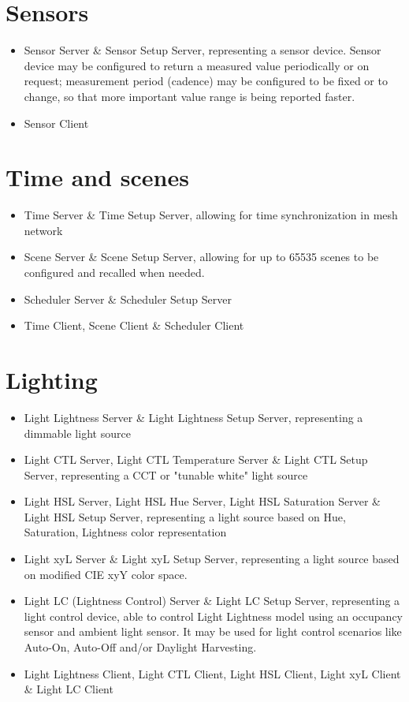 \section{Sensors}
\begin{itemize}
\item Sensor Server \& Sensor Setup Server, representing a sensor device. Sensor device may be configured to return a measured value periodically or on request; measurement period (cadence) may be configured to be fixed or to change, so that more important value range is being reported faster.
\item Sensor Client
\end{itemize}

\section{Time and scenes}
\begin{itemize}
\item Time Server \& Time Setup Server, allowing for time synchronization in mesh network
\item Scene Server \& Scene Setup Server, allowing for up to 65535 scenes to be configured and recalled when needed.
\item Scheduler Server \& Scheduler Setup Server
\item Time Client, Scene Client \& Scheduler Client
\end{itemize}

\section{Lighting}
\begin{itemize}
\item Light Lightness Server \& Light Lightness Setup Server, representing a dimmable light source
\item Light CTL Server, Light CTL Temperature Server \& Light CTL Setup Server, representing a CCT or "tunable white" light source
\item Light HSL Server, Light HSL Hue Server, Light HSL Saturation Server \& Light HSL Setup Server, representing a light source based on Hue, Saturation, Lightness color representation
\item Light xyL Server \& Light xyL Setup Server, representing a light source based on modified CIE xyY color space.
\item Light LC (Lightness Control) Server \& Light LC Setup Server, representing a light control device, able to control Light Lightness model using an occupancy sensor and ambient light sensor. It may be used for light control scenarios like Auto-On, Auto-Off and/or Daylight Harvesting.
\item Light Lightness Client, Light CTL Client, Light HSL Client, Light xyL Client \& Light LC Client
\end{itemize}

